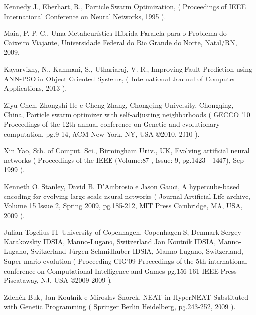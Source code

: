 \documentclass[a4paper,12pt]{article}
\begin{document}
  \begin{thebibliography}{9}

      Kennedy J., Eberhart, R.,
      Particle Swarm Optimization,
      ( Proceedings of IEEE International Conference on Neural Networks,
      1995 ).

      Maia, P. P. C.,
      Uma Metaheurística Híbrida Paralela para o Problema do Caixeiro Viajante,
      Universidade Federal do Rio Grande do Norte,
      Natal/RN,
      2009.

      Kayarvizhy, N., Kanmani, S., Uthariaraj, V. R.,
      Improving Fault Prediction using ANN-PSO in Object Oriented Systems,
      ( International Journal of Computer Applications,
      2013 ).

      Ziyu Chen, Zhongshi He e Cheng Zhang,
      Chongqing University, Chongqing, China,
      Particle swarm optimizer with self-adjusting neighborhoods
      ( GECCO '10 Proceedings of the 12th annual conference on Genetic and evolutionary computation,
      pg.9-14,
      ACM New York, NY, USA ©2010,
      2010 ).
    
      Xin Yao,
      Sch. of Comput. Sci., Birmingham Univ., UK,
      Evolving artificial neural networks
      ( Proceedings of the IEEE  (Volume:87 ,  Issue: 9, pg.1423 - 1447),
      Sep 1999 ).
      
      Kenneth O. Stanley, David B. D'Ambrosio e Jason Gauci,
      A hypercube-based encoding for evolving large-scale neural networks
      ( Journal Artificial Life archive,
      Volume 15 Issue 2, Spring 2009,
      pg.185-212,
      MIT Press Cambridge, MA, USA,
      2009 ).
      
      Julian Togelius 	IT University of Copenhagen, Copenhagen S, Denmark
      Sergey Karakovskiy 	IDSIA, Manno-Lugano, Switzerland
      Jan Koutník 	IDSIA, Manno-Lugano, Switzerland
      Jürgen Schmidhuber 	IDSIA, Manno-Lugano, Switzerland,
      Super mario evolution
      ( Proceeding CIG'09 Proceedings of the 5th international conference on Computational Intelligence and Games
      pg.156-161
      IEEE Press Piscataway, NJ, USA ©2009 
      2009 ).
      
      Zdeněk Buk, Jan Koutník e Miroslav Šnorek,
      NEAT in HyperNEAT Substituted with Genetic Programming
      ( Springer Berlin Heidelberg,
      pg.243-252,
      2009 ).

  \end{thebibliography}

 
\end{document}
